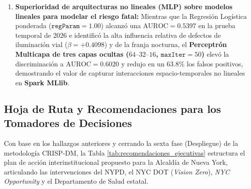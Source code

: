 \begin{enumerate}
    \item \textbf{Superioridad de arquitecturas no lineales (MLP) sobre modelos lineales para modelar el riesgo fatal:}
    Mientras que la Regresión Logística ponderada ($\texttt{regParam}=1.00$) alcanzó una $\text{AUROC} = 0.5397$ en la prueba temporal de 2026 e identificó la alta influencia relativa de defectos de iluminación vial ($\beta = +0.4098$) y de la franja nocturna, el \textbf{Perceptrón Multicapa de tres capas ocultas ($64\text{--}32\text{--}16$, $\texttt{maxIter}=50$)} elevó la discriminación a $\text{AUROC} = 0.6020$ y redujo en un $63.8\%$ los falsos positivos, demostrando el valor de capturar interacciones espacio-temporales no lineales en \textbf{Spark MLlib}.
\end{enumerate}

\subsection{Hoja de Ruta y Recomendaciones para los Tomadores de Decisiones}

Con base en los hallazgos anteriores y cerrando la sexta fase (Despliegue) de la metodología CRISP-DM, la Tabla \ref{tab:recomendaciones_ejecutivas} estructura el plan de acción interinstitucional propuesto para la Alcaldía de Nueva York, articulando las intervenciones del NYPD, el NYC DOT (\textit{Vision Zero}), \textit{NYC Opportunity} y el Departamento de Salud estatal.

